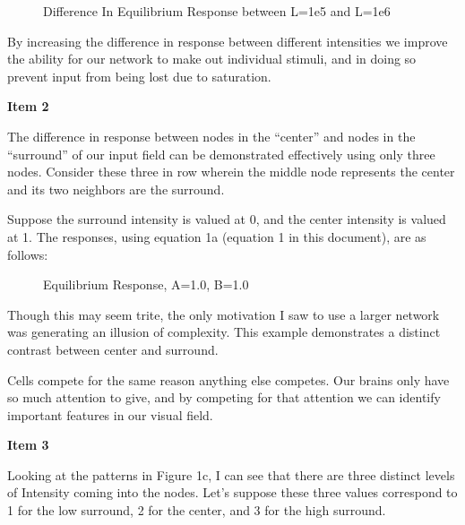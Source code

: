 \documentclass[a4paper,12pt]{article}
\begin{document}
\begin{center}
  \begin{figure}[h!]
    \caption{\label{pict1}Difference In Equilibrium Response between L=1e5 and L=1e6}
  \end{figure}
\end{center}



By increasing the difference in response between different intensities we improve the ability for our network to make out individual stimuli, and in doing so prevent input from being lost due to saturation. 

\bigskip
{\bf Item 2}
\bigskip

The difference in response between nodes in the ``center'' and nodes in the ``surround'' of our input field can be demonstrated effectively using only three nodes. Consider these three in row wherein the middle node represents the center and its two neighbors are the surround. 

\vspace{2mm}

Suppose the surround intensity is valued at 0, and the center intensity is valued at 1. The responses, using equation 1a (equation 1 in this document), are as follows:

\begin{center}
  \begin{figure}[h!]
    \caption{\label{pict1}Equilibrium Response, A=1.0, B=1.0}
  \end{figure}
\end{center}

Though this may seem trite, the only motivation I saw to use a larger network was generating an illusion of complexity. This example demonstrates a distinct contrast between center and surround. 

\vspace{2mm}

Cells compete for the same reason anything else competes. Our brains only have so much attention to give, and by competing for that attention we can identify important features in our visual field.

\vfil\eject
{\bf Item 3}
\bigskip

Looking at the patterns in Figure 1c, I can see that there are three distinct levels of Intensity coming into the nodes. Let's suppose these three values correspond to 1 for the low surround, 2 for the center, and 3 for the high surround. 
\end{document}
